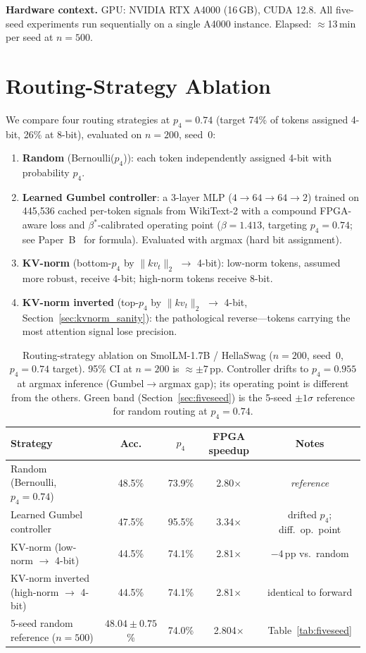 \documentclass{article}
\begin{document}
\textbf{Hardware context.} GPU: NVIDIA RTX A4000 (16\,GB), CUDA 12.8.
All five-seed experiments run sequentially on a single A4000 instance.
Elapsed: $\approx$13\,min per seed at $n{=}500$.

\section{Routing-Strategy Ablation}
\label{sec:routing_ablation}

We compare four routing strategies at $p_4{=}0.74$ (target 74\% of tokens assigned 4-bit,
26\% at 8-bit), evaluated on $n{=}200$, seed~0:

\begin{enumerate}
\item \textbf{Random} (Bernoulli($p_4$)): each token independently assigned 4-bit with
probability $p_4$.
\item \textbf{Learned Gumbel controller}: a 3-layer MLP ($4{\to}64{\to}64{\to}2$) trained
on 445,536 cached per-token signals from WikiText-2 with a compound FPGA-aware loss and
$\beta^*$-calibrated operating point ($\beta{=}1.413$, targeting $p_4{=}0.74$; see
Paper~B~\citep{companion_paper_b} for formula). Evaluated with argmax (hard bit assignment).
\item \textbf{KV-norm} (bottom-$p_4$ by $\|kv_t\|_2$ $\to$ 4-bit): low-norm tokens, assumed
more robust, receive 4-bit; high-norm tokens receive 8-bit.
\item \textbf{KV-norm inverted} (top-$p_4$ by $\|kv_t\|_2$ $\to$ 4-bit, Section~\ref{sec:kvnorm_sanity}):
the pathological reverse---tokens carrying the most attention signal lose precision.
\end{enumerate}

\begin{table}[h]
\centering
\caption{Routing-strategy ablation on SmolLM-1.7B / HellaSwag ($n{=}200$, seed~0,
$p_4{=}0.74$ target). 95\% CI at $n{=}200$ is $\approx\pm7$\,pp. Controller drifts to
$p_4{=}0.955$ at argmax inference (Gumbel$\to$argmax gap); its operating point is different
from the others. Green band (Section~\ref{sec:fiveseed}) is the 5-seed $\pm1\sigma$ reference
for random routing at $p_4{=}0.74$.}
\begin{tabular}{lcccc}
\toprule
Strategy & Acc. & $p_4$ & FPGA speedup & Notes \\
\midrule
Random (Bernoulli, $p_4{=}0.74$) & 48.5\% & 73.9\% & 2.80$\times$ & \textit{reference} \\
Learned Gumbel controller        & 47.5\% & 95.5\% & 3.34$\times$ & drifted $p_4$; diff.\ op.\ point \\
KV-norm (low-norm $\to$ 4-bit)   & 44.5\% & 74.1\% & 2.81$\times$ & $-4$\,pp vs.\ random \\
KV-norm inverted (high-norm $\to$ 4-bit) & 44.5\% & 74.1\% & 2.81$\times$ & identical to forward \\
\midrule
5-seed random reference ($n{=}500$) & $48.04\pm0.75$\% & 74.0\% & 2.804$\times$ & Table~\ref{tab:fiveseed} \\
\bottomrule
\end{tabular}
\label{tab:routing}
\end{table}
\end{document}
